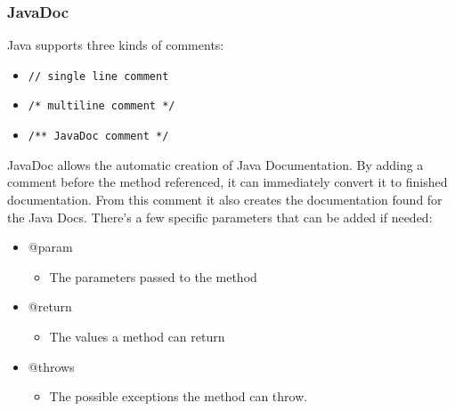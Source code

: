\documentclass{article}
\begin{document}
	\subsubsection{JavaDoc}
	Java supports three kinds of comments:
	\begin{itemize}
		\item{\texttt{// single line comment}}
		\item{\texttt{/* multiline comment */}}
		\item{\texttt{/** JavaDoc comment */}}
	\end{itemize}
	JavaDoc allows the automatic creation of Java Documentation. By adding a comment before the method referenced, it can immediately convert it to finished documentation. From this comment it also creates the documentation found for the Java Docs. There's a few specific parameters that can be added if needed:
	\begin{itemize}
		\item{@param}
		\begin{itemize}
			\item{The parameters passed to the method}
		\end{itemize}
		\item{@return}
		\begin{itemize}
			\item{The values a method can return}
		\end{itemize}
		\item{@throws}
		\begin{itemize}
			\item{The possible exceptions the method can throw.}
		\end{itemize}
	\end{itemize}

























	
\end{document}
